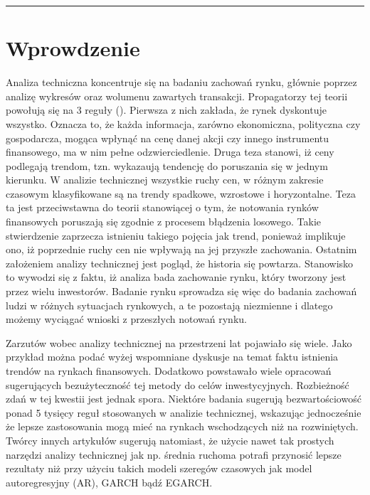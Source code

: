 \documentclass[polish, twoside, 12pt, a4paper]{article}
\theoremstyle{definition}
\theoremstyle{plain}
\theoremstyle{remark}
\begin{document}
\rule{1ex}{0ex}\clearpage


\cleardoublepage
\tableofcontents

\cleardoublepage
\section{Wprowdzenie}

Analiza techniczna koncentruje się na badaniu zachowań rynku, głównie poprzez analizę wykresów oraz wolumenu zawartych transakcji. Propagatorzy tej teorii powołują się
na 3 reguły (\cite{Murphy1999}). Pierwsza z nich zakłada, że rynek dyskontuje wszystko. Oznacza to, że każda informacja, zarówno ekonomiczna, polityczna czy gospodarcza, mogąca wpłynąć na cenę danej akcji czy innego
instrumentu finansowego, ma w nim pełne odzwierciedlenie. Druga teza stanowi, iż ceny podlegają trendom, tzn. wykazaują  tendencję do poruszania się w jednym kierunku. W analizie technicznej 
wszystkie ruchy cen, w różnym zakresie czasowym klasyfikowane są na trendy spadkowe, wzrostowe i horyzontalne. Teza ta jest przeciwstawna do teorii stanowiącej o tym, że notowania rynków finansowych 
poruszają się zgodnie z procesem błądzenia losowego. Takie stwierdzenie zaprzecza istnieniu takiego pojęcia jak trend, ponieważ implikuje ono, iż poprzednie ruchy cen nie wpływają na jej przyszłe zachowania. 
Ostatnim założeniem analizy technicznej jest pogląd, że historia się powtarza. Stanowisko to wywodzi się z faktu, iż analiza bada zachowanie rynku, który tworzony jest przez wielu inwestorów. Badanie rynku
sprowadza się więc do badania zachowań ludzi w różnych sytuacjach rynkowych, a te pozostają niezmienne i dlatego możemy wyciągać wnioski z przeszłych notowań rynku. 

Zarzutów wobec analizy technicznej na przestrzeni lat pojawiało się wiele. Jako przykład można podać wyżej wspomniane dyskusje na temat faktu istnienia trendów na rynkach finansowych. Dodatkowo powstawało wiele 
opracowań sugerujących bezużyteczność tej metody do celów inwestycyjnych. Rozbieżność zdań w tej kwestii jest jednak spora. Niektóre badania sugerują bezwartościowość ponad 5 tysięcy reguł
stosowanych w analizie technicznej, wskazując jednocześnie że lepsze zastosowania mogą mieć na rynkach wschodzących niż na rozwiniętych. Twórcy innych artykułów sugerują natomiast, że użycie nawet tak 
prostych narzędzi analizy technicznej jak np. średnia ruchoma potrafi przynosić lepsze rezultaty niż przy użyciu takich modeli szeregów czasowych jak model autoregresyjny (AR), GARCH bądź EGARCH.  
\end{document}
